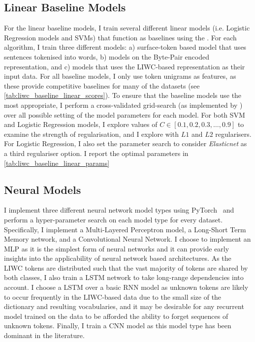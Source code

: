 \subsection{Linear Baseline Models}\label{sec:baseline_models}

For the linear baseline models, I train several different linear models (i.e. Logistic Regression models and SVMs) that function as baselines using the \citet{Pedregosa:2015}. For each algorithm, I train three different models: a) surface-token based model that uses sentences tokenised into words, b) models on the Byte-Pair encoded representation, and c) models that uses the LIWC-based representation as their input data. For all baseline models, I only use token unigrams as features, as these provide competitive baselines for many of the datasets (see \autoref{tab:liwc_baseline_linear_scores}). To ensure that the baseline models use the most appropriate, I perform a cross-validated grid-search (as implemented by \citet{Pedregosa:2015}) over all possible setting of the model parameters for each model. For both SVM and Logistic Regression models, I explore values of $C\in [0.1, 0.2, 0.3, \ldots, 0.9]$ to examine the strength of regularisation, and I explore with $L1$ and $L2$ regularisers. For Logistic Regression, I also set the parameter search to consider \textit{Elasticnet} as a third regulariser option. I report the optimal parameters in \cref{tab:liwc_baseline_linear_params}



\subsection{Neural Models}\label{sec:redux_neural}

I implement three different neural network model types using PyTorch~\citep{Paszke:2019} and perform a hyper-parameter search on each model type for every dataset. Specifically, I implement a Multi-Layered Perceptron model, a Long-Short Term Memory network, and a Convolutional Neural Network.
I choose to implement an MLP as it is the simplest form of neural networks and it can provide early insights into the applicability of neural network based architectures.
As the LIWC tokens are distributed such that the vast majority of tokens are shared by both classes, I also train a LSTM network to take long-range dependencies into account. I choose a LSTM over a basic RNN model as unknown tokens are likely to occur frequently in the LIWC-based data due to the small size of the dictionary and resulting vocabularies, and it may be desirable for any recurrent model trained on the data to be afforded the ability to forget sequences of unknown tokens.
Finally, I train a CNN model as this model type has been dominant in the literature.

